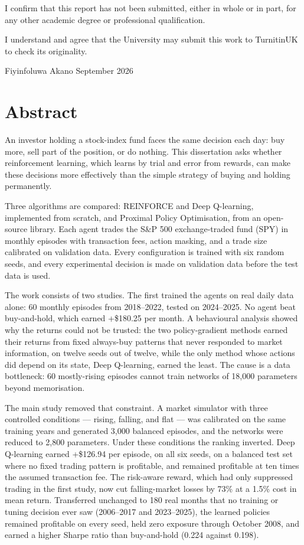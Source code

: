 \documentclass[11pt,a4paper,openany]{report}
\begin{document}
I confirm that this report has not been submitted, either in whole or in
part, for any other academic degree or professional qualification.

I understand and agree that the University may submit this work to
TurnitinUK to check its originality.

\vspace{3em}
\noindent Fiyinfoluwa Akano \hfill September 2026

\chapter*{Abstract}
An investor holding a stock-index fund faces the same decision each day:
buy more, sell part of the position, or do nothing. This dissertation
asks whether reinforcement learning, which learns by trial and error
from rewards, can make these decisions more effectively than the simple
strategy of buying and holding permanently.

Three algorithms are compared: REINFORCE and Deep Q-learning,
implemented from scratch, and Proximal Policy Optimisation, from an
open-source library. Each agent trades the S\&P 500 exchange-traded fund
(SPY) in monthly episodes with transaction fees, action masking, and a
trade size calibrated on validation data. Every configuration is trained
with six random seeds, and every experimental decision is made on
validation data before the test data is used.

The work consists of two studies. The first trained the agents on real
daily data alone: 60 monthly episodes from 2018--2022, tested on
2024--2025. No agent beat buy-and-hold, which earned +\$180.25 per
month. A behavioural analysis showed why the returns could not be
trusted: the two policy-gradient methods earned their returns from fixed
always-buy patterns that never responded to market information, on
twelve seeds out of twelve, while the only method whose actions did
depend on its state, Deep Q-learning, earned the least. The cause is a
data bottleneck: 60 mostly-rising episodes cannot train networks of
18,000 parameters beyond memorisation.

The main study removed that constraint. A market simulator with three
controlled conditions --- rising, falling, and flat --- was calibrated
on the same training years and generated 3,000 balanced episodes, and
the networks were reduced to 2,800 parameters. Under these conditions the ranking
inverted. Deep Q-learning earned +\$126.94 per episode, on all six
seeds, on a balanced test set where no fixed trading pattern is
profitable, and remained profitable at ten times the assumed transaction fee.
The risk-aware reward, which had only suppressed trading in the first
study, now cut falling-market losses by 73\% at a 1.5\% cost in mean
return. Transferred unchanged to 180 real months that no training or
tuning decision ever saw (2006--2017 and 2023--2025), the learned
policies remained profitable on every seed, held zero exposure through
October 2008, and earned a higher Sharpe ratio than buy-and-hold (0.224
against 0.198).
\end{document}
